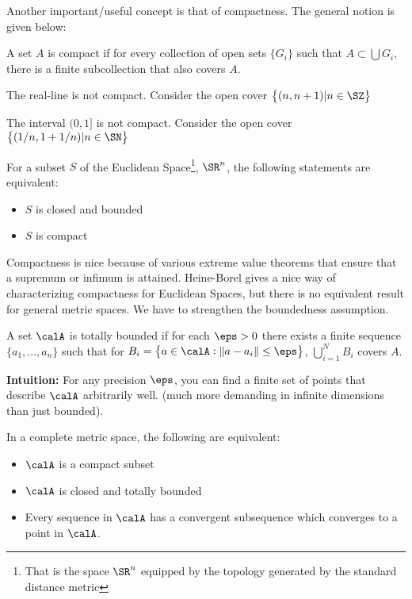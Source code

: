 Another important/useful concept is that of compactness. The general notion is given below:

\begin{definition}
	\label{def:compact}
	A set \(A\) is compact if for every collection of open sets  \(\{G_i\}\) such that \(A\subset \bigcup G_i \), there is a finite subcollection that also covers \(A\).
\end{definition}
\begin{example}[]
	\label{ex:reals}
	The real-line is not compact. Consider the open cover \(\left\{(n,n+1)|n\in\SZ\right\} \)
\end{example}
\begin{example}[]
	\label{ex:halfopen}
	The interval \((0,1]\) is not compact. Consider the open cover  \(\left\{(1/n, 1+1/n)| n\in \SN \right\}\)
\end{example}
\begin{theorem}
	\label{thm:heine-borel}
	For a subset \(S\) of the Euclidean Space\footnote{That is the space \(\SR^n\) equipped by the topology generated by the standard distance metric}, \(\SR^n\), the following statements are equivalent:
	 \begin{itemize}
		\item \(S\) is closed and bounded
		\item  \(S\) is compact
	\end{itemize}
\end{theorem}
Compactness is nice because of various extreme value theorems that ensure that a supremum or infimum is attained. Heine-Borel gives a nice way of characterizing compactness for Euclidean Spaces, but there is no equivalent result for general metric spaces. We have to strengthen the boundedness assumption.

\begin{definition}
	\label{def:totally-bounded}
	A set \(\calA\) is totally bounded if for each  \(\eps> 0\) there exists a finite sequence  \(\{a_1,\dots,a_n\}\) such that for \(B_i = \left\{a\in\calA: \left\|a-a_i\right\|\leq \eps\right\}\), \(\bigcup_{i=1}^N B_i\) covers  \(A\).	
\end{definition}

\textbf{Intuition:} For any precision \(\eps\), you can find a finite set of points that describe  \(\calA\) arbitrarily well. (much more demanding in infinite dimensions than just bounded).

\begin{theorem}[]
	In a complete metric space, the following are equivalent:
	\begin{itemize}
		\item \(\calA\) is a compact subset
		\item \(\calA\) is closed and totally bounded 
 		\item Every sequence in \(\calA\) has a convergent subsequence which converges to a point in  \(\calA\).
	\end{itemize}
\end{theorem}

